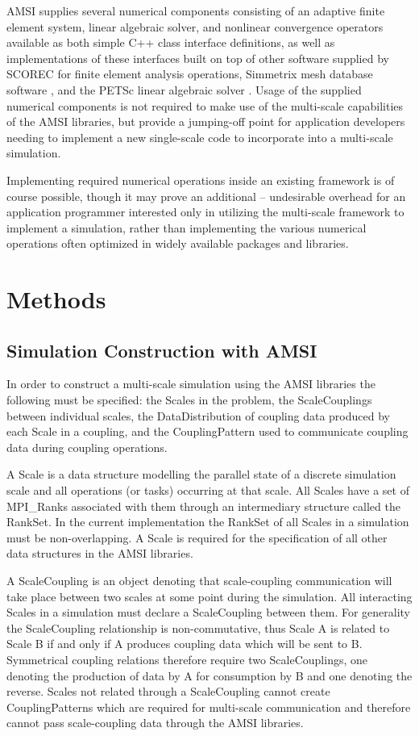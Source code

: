\documentclass[11pt]{article}
\begin{document}
AMSI supplies several numerical components consisting of an adaptive finite element system, linear algebraic solver, and nonlinear convergence operators available as both simple C++ class interface definitions, as well as implementations of these interfaces built on top of other software supplied by SCOREC \cite{core} for finite element analysis operations, Simmetrix mesh database software \cite{simmetrix}, and the PETSc linear algebraic solver \cite{petsc-web-page} \cite{petsc-user-ref} \cite{petsc-efficient}. 
Usage of the supplied numerical components is not required to make use of the multi-scale capabilities of the AMSI libraries, but provide a jumping-off point for application developers needing to implement a new single-scale code to incorporate into a multi-scale simulation.

Implementing required numerical operations inside an existing framework is of course possible, though it may prove an additional -- undesirable overhead for an application programmer interested only in utilizing the multi-scale framework to implement a simulation, rather than implementing the various numerical operations often optimized in widely available packages and libraries.

\section{Methods}\label{methods}

\subsection{Simulation Construction with AMSI}
In order to construct a multi-scale simulation using the AMSI libraries the following must be specified: the Scales in the problem, the ScaleCouplings between individual scales, the DataDistribution of coupling data produced by each Scale in a coupling, and the CouplingPattern used to communicate coupling data during coupling operations. 

A Scale is a data structure modelling the parallel state of a discrete simulation scale and all operations (or tasks) occurring at that scale. 
All Scales have a set of MPI\_Ranks associated with them through an intermediary structure called the RankSet. 
In the current implementation the RankSet of all Scales in a simulation must be non-overlapping.  
A Scale is required for the specification of all other data structures in the AMSI libraries. 

A ScaleCoupling is an object denoting that scale-coupling communication will take place between two scales at some point during the simulation. 
All interacting Scales in a simulation must declare a ScaleCoupling between them.
For generality the ScaleCoupling relationship is non-commutative, thus Scale A is related to Scale B if and only if A produces coupling data which will be sent to B.
Symmetrical coupling relations therefore require two ScaleCouplings, one denoting the production of data by A for consumption by B and one denoting the reverse.
Scales not related through a ScaleCoupling cannot create CouplingPatterns which are required for multi-scale communication and therefore cannot pass scale-coupling data through the AMSI libraries.
\end{document}
